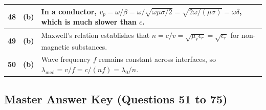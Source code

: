 {\begin{tabularx}{\textwidth}{|c|c|X|}
\textbf{48} & \textbf{(b)} & In a conductor, $v_p = \omega/\beta = \omega/\sqrt{\omega\mu\sigma/2} = \sqrt{2\omega/(\mu\sigma)} = \omega \delta$, which is much slower than $c$. \\ \hline
\textbf{49} & \textbf{(b)} & Maxwell's relation establishes that $n = c/v = \sqrt{\mu_r \epsilon_r} = \sqrt{\epsilon_r}$ for non-magnetic substances. \\ \hline
\textbf{50} & \textbf{(b)} & Wave frequency $f$ remains constant across interfaces, so $\lambda_{\text{med}} = v/f = c/(n f) = \lambda_0 / n$. \\ \hline
\end{tabularx}
}

\newpage

\subsection*{Master Answer Key (Questions 51 to 75)}

